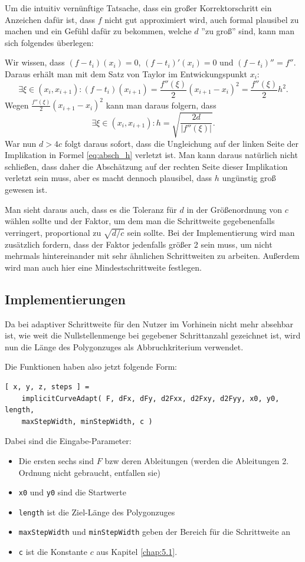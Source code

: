 \documentclass[a4paper,11pt,bibliography=totoc,listof=totoc,headinclude=true,cleardoublepage=empty,oneside]{scrartcl}
\begin{document}
Um die intuitiv vernünftige Tatsache, dass ein großer Korrektorschritt ein Anzeichen dafür ist, dass $f$ nicht gut approximiert wird, auch formal plausibel zu machen und ein Gefühl dafür zu bekommen, welche $d$ ''zu groß'' sind, kann man sich folgendes überlegen:

Wir wissen, dass $(f-t_i)(x_i)=0$, $(f-t_i)'(x_i)=0$ und $(f-t_i)''=f''$. Daraus erhält man mit dem Satz von Taylor im Entwickungspunkt $x_i$:
\[
\exists \xi \in (x_i,x_{i+1}) : (f-t_i)(x_{i+1}) = \frac{f''(\xi)}{2}(x_{i+1}-x_i)^2 = \frac{f''(\xi)}{2}h^2.
\]
Wegen $\frac{f''(\xi)}{2}(x_{i+1}-x_i)^2$ kann man daraus folgern, dass
\[
\exists \xi \in (x_i,x_{i+1}) : h = \sqrt{\frac{2d}{|f''(\xi)|}}.
\]
War nun $d > 4c$ folgt daraus sofort, dass die Ungleichung auf der linken Seite der Implikation in Formel \eqref{eq:absch_h} verletzt ist. Man kann daraus natürlich nicht schließen, dass daher die Abschätzung auf der rechten Seite dieser Implikation verletzt sein muss, aber es macht dennoch plausibel, dass $h$ ungünstig groß gewesen ist. 

Man sieht daraus auch, dass es die Toleranz für $d$ in der Größenordnung von $c$ wählen sollte und der Faktor, um dem man die Schrittweite gegebenenfalls verringert, proportional zu $\sqrt{d/c}$ sein sollte. Bei der Implementierung wird man zusätzlich fordern, dass der Faktor jedenfalls größer 2 sein muss, um nicht mehrmals hintereinander mit sehr ähnlichen Schrittweiten zu arbeiten. Außerdem wird man auch hier eine Mindestschrittweite festlegen.

\subsection{Implementierungen}
Da bei adaptiver Schrittweite für den Nutzer im Vorhinein nicht mehr absehbar ist, wie weit die Nullstellenmenge bei gegebener Schrittanzahl gezeichnet ist, wird nun die Länge des Polygonzuges als Abbruchkriterium verwendet.

Die Funktionen haben also jetzt folgende Form:
\begin{verbatim}
[ x, y, z, steps ] = 
    implicitCurveAdapt( F, dFx, dFy, d2Fxx, d2Fxy, d2Fyy, x0, y0, length,
    maxStepWidth, minStepWidth, c )
\end{verbatim}
Dabei sind die Eingabe-Parameter:
\begin{itemize}
	\item Die ersten sechs sind $F$ bzw deren Ableitungen (werden die Ableitungen 2. Ordnung nicht gebraucht, entfallen sie)
	\item \verb|x0| und \verb|y0| sind die Startwerte
	\item \verb|length| ist die Ziel-Länge des Polygonzuges
	\item \verb|maxStepWidth| und \verb|minStepWidth| geben der Bereich für die Schrittweite an
	\item \verb|c| ist die Konstante $c$ aus Kapitel \ref{chap:5.1}.
\end{itemize}
\end{document}
